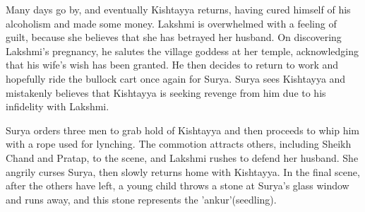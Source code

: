 \documentclass{article}
\begin{document}
Many days go by, and eventually Kishtayya returns, having cured himself of his alcoholism and made some money. Lakshmi is overwhelmed with a feeling of guilt, because she believes that she has betrayed her husband. On discovering Lakshmi's pregnancy, he salutes the village goddess at her temple, acknowledging that his wife's wish has been granted. He then decides to return to work and hopefully ride the bullock cart once again for Surya. Surya sees Kishtayya and mistakenly believes that Kishtayya is seeking revenge from him due to his infidelity with Lakshmi.

Surya orders three men to grab hold of Kishtayya and then proceeds to whip him with a rope used for lynching. The commotion attracts others, including Sheikh Chand and Pratap, to the scene, and Lakshmi rushes to defend her husband. She angrily curses Surya, then slowly returns home with Kishtayya. In the final scene, after the others have left, a young child throws a stone at Surya's glass window and runs away, and this stone represents the 'ankur'(seedling).
\end{document}
